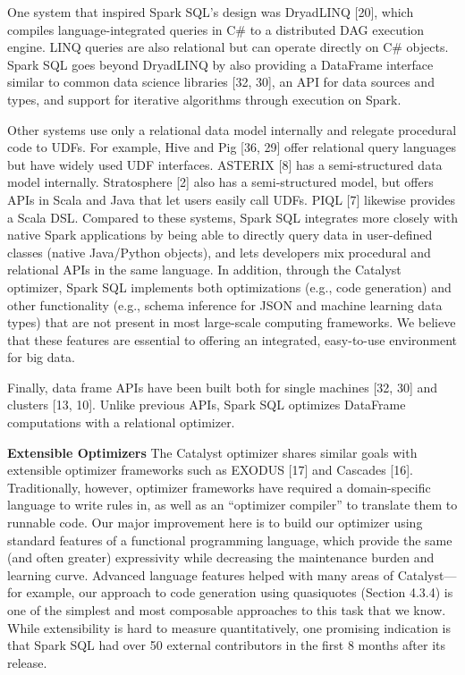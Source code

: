 \documentclass[runningheads,a4paper]{llncs}
\begin{document}
One system that inspired Spark SQL’s design was DryadLINQ [20], which compiles language-integrated queries in C\# to a distributed DAG execution engine. LINQ queries are also relational but can operate directly on C\# objects. Spark SQL goes beyond DryadLINQ by also providing a DataFrame interface similar to common data science libraries [32, 30], an API for data sources and types, and support for iterative algorithms through execution on Spark.

Other systems use only a relational data model internally and relegate procedural code to UDFs. For example, Hive and Pig [36, 29] offer relational query languages but have widely used UDF interfaces. ASTERIX [8] has a semi-structured data model internally. Stratosphere [2] also has a semi-structured model, but offers APIs in Scala and Java that let users easily call UDFs. PIQL [7] likewise provides a Scala DSL. Compared to these systems, Spark SQL integrates more closely with native Spark applications by being able to directly query data in user-defined classes (native Java/Python objects), and lets developers mix procedural and relational APIs in the same language. In addition, through the Catalyst optimizer, Spark SQL implements both optimizations (e.g., code generation) and other functionality (e.g., schema inference for JSON and machine learning data types) that are not present in most large-scale computing frameworks. We believe that these features are essential to offering an integrated, easy-to-use environment for big data.

Finally, data frame APIs have been built both for single machines [32, 30] and clusters [13, 10]. Unlike previous APIs, Spark SQL optimizes DataFrame computations with a relational optimizer.

\textbf{Extensible Optimizers} The Catalyst optimizer shares similar goals with extensible optimizer frameworks such as EXODUS [17] and Cascades [16]. Traditionally, however, optimizer frameworks have required a domain-specific language to write rules in, as well as an “optimizer compiler” to translate them to runnable code. Our major improvement here is to build our optimizer using standard features of a functional programming language, which provide the same (and often greater) expressivity while decreasing the maintenance burden and learning curve. Advanced language features helped with many areas of Catalyst—for example, our approach to code generation using quasiquotes (Section 4.3.4) is one of the simplest and most composable approaches to this task that we know. While extensibility is hard to measure quantitatively, one promising indication is that Spark SQL had over 50 external contributors in the first 8 months after its release.
\end{document}
